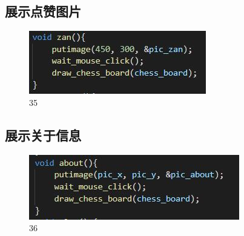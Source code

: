 \documentclass[UTF8]{ctexart}
\begin{document}
\subsection{展示点赞图片}
\begin{figure}[H]
    \centering
    \includegraphics[scale=1.0]{34.jpg}
\caption{35}
\end{figure}
\subsection{展示关于信息}
\begin{figure}[H]
    \centering
    \includegraphics[scale=1.0]{35.jpg}
\caption{36}
\end{figure}
\newpage
\end{document}
